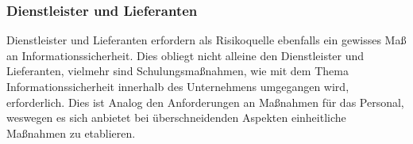 \documentclass[11pt,a4paper,hidelinks]{article}   %
\begin{document}
            \subsubsection{Dienstleister und Lieferanten} 
            Dienstleister und Lieferanten erfordern als Risikoquelle ebenfalls ein gewisses Maß an Informationssicherheit. Dies obliegt nicht alleine den Dienstleister und Lieferanten, vielmehr sind Schulungsmaßnahmen, wie mit dem Thema Informationssicherheit innerhalb des Unternehmens umgegangen wird, erforderlich. Dies ist Analog den Anforderungen an Maßnahmen für das Personal, weswegen es sich anbietet bei überschneidenden Aspekten einheitliche Maßnahmen zu etablieren.
\end{document}
